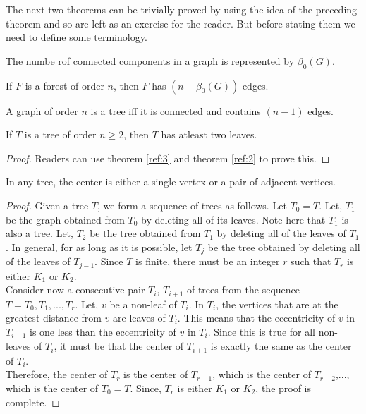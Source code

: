 \documentclass[../basic_graph_theory.tex]{subfiles}
\begin{document}
The next two theorems can be trivially proved by using the idea of the preceding theorem and so are left as an exercise for the reader. But before stating them we need to define some terminology.

\begin{defn}
    The numbe rof connected components in a graph is represented by $\beta_{0}(G)$.
\end{defn}

\begin{thm}
    If $F$ is a forest of order $n$, then $F$ has $(n-\beta_{0}(G))$ edges.
\end{thm}

\begin{thm}
    \label{ref:2}
    A graph of order $n$ is a tree iff it is connected and contains $(n-1)$ edges.
\end{thm}

\begin{thm}
    If $T$ is a tree of order $n \ge 2$, then $T$ has atleast two leaves.
\end{thm}
\begin{proof}
    Readers can use theorem \ref{ref:3} and theorem \ref{ref:2} to prove this.
\end{proof}

\begin{thm}
    In any tree, the center is either a single vertex or a pair of adjacent vertices.
\end{thm}
\begin{proof}
    Given a tree $T$, we form a sequence of trees as follows. Let $T_0 = T$. Let, $T_1$ be the graph obtained from $T_0$ by deleting all of its leaves. Note here that $T_1$ is also a tree. Let, $T_2$ be the tree obtained from $T_1$ by deleting all of the leaves of $T_1$. In general, for as long as it is possible, let $T_j$ be the tree obtained by deleting all of the leaves of $T_{j-1}$. Since $T$ is finite, there must be an integer $r$ such that $T_r$ is either $K_1$ or $K_2$.\\
    Consider now a consecutive pair $T_i$, $T_{i+1}$ of trees from the sequence $T=T_0, T_1,..., T_r$. Let, $v$ be a non-leaf of $T_i$. In $T_i$, the vertices that are at the greatest distance from $v$ are leaves of $T_i$. This means that the eccentricity of $v$ in $T_{i+1}$ is one less than the eccentricity of $v$ in $T_i$. Since this is true for all non-leaves of $T_i$, it must be that the center of $T_{i+1}$ is exactly the same as the center of $T_i$.\\
    Therefore, the center of $T_r$ is the center of $T_{r-1}$, which is the center of $T_{r-2}$,..., which is the center of $T_0=T$. Since, $T_r$ is either $K_1$ or $K_2$, the proof is complete.
\end{proof}
\end{document}
